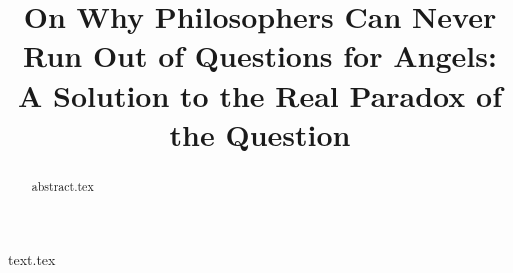 \documentclass[12pt]{article}
\title{On Why Philosophers Can Never Run Out of Questions for Angels: A Solution to the Real Paradox of the Question}
\author{}
\date{}
\theoremstyle{mytheoremstyle} %
\begin{document}
 
\maketitle 
\begin{abstract}
{abstract.tex}
\end{abstract}
{text.tex}
\printbibliography[]
\end{document}

